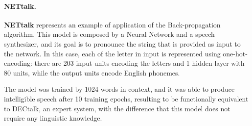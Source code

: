 \paragraph*{NETtalk.} \textbf{NETtalk} represents an example of application of the Back-propagation algorithm. This model is composed by a Neural Network and a speech synthesizer, and its goal is to pronounce the string that is provided as input to the network. In this case, each of the letter in input is represented using one-hot-encoding: there are 203 input units encoding the letters and 1 hidden layer with 80 units, while the output units encode English phonemes.

The model was trained by 1024 words in context, and it was able to produce intelligible speech after 10 training epochs, resulting to be functionally equivalent to DECtalk, an expert system, with the difference that this model does not require any linguistic knowledge.

